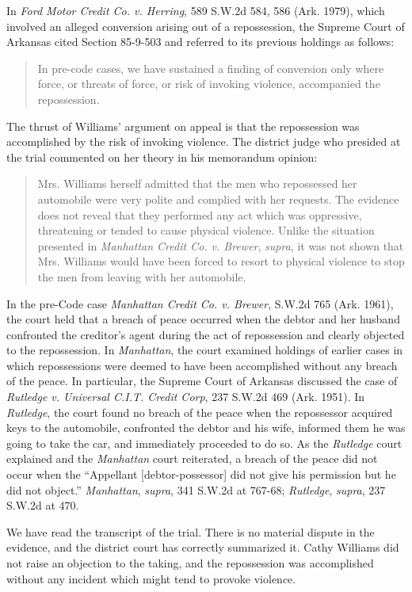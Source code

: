 In \textit{Ford Motor Credit Co. v. Herring}, 589 S.W.2d 584, 586 (Ark. 1979),
which involved an alleged conversion arising out of a repossession, the Supreme
Court of Arkansas cited Section 85-9-503 and referred to its previous holdings
as follows:
\begin{quote}
In pre-code cases, we have sustained a finding of conversion only where force,
or threats of force, or risk of invoking violence, accompanied the
repossession.
\end{quote}
The thrust of Williams' argument on appeal is that the repossession was
accomplished by the risk of invoking violence. The district judge who presided
at the trial commented on her theory in his memorandum opinion:
\begin{quote}
Mrs. Williams herself admitted that the men who repossessed her automobile were
very polite and complied with her requests. The evidence does not reveal that
they performed any act which was oppressive, threatening or tended to cause
physical violence. Unlike the situation presented in \textit{Manhattan Credit
Co. v. Brewer}, \textit{supra}, it was not shown that Mrs. Williams would have
been forced to resort to physical violence to stop the men from leaving with
her automobile.
\end{quote}
In the pre-Code case \textit{Manhattan Credit Co. v. Brewer}, S.W.2d 765 (Ark.
1961), the court held that a breach of peace occurred when the debtor and her
husband confronted the creditor's agent during the act of repossession and
clearly objected to the repossession. In \textit{Manhattan}, the court examined
holdings of earlier cases in which repossessions were deemed to have been
accomplished without any breach of the peace. In particular, the Supreme Court
of Arkansas discussed the case of \textit{Rutledge v. Universal C.I.T. Credit
Corp}, 237 S.W.2d 469 (Ark. 1951). In \textit{Rutledge}, the court found no
breach of the peace when the repossessor acquired keys to the automobile,
confronted the debtor and his wife, informed them he was going to take the car,
and immediately proceeded to do so. As the \textit{Rutledge} court explained
and the \textit{Manhattan} court reiterated, a breach of the peace did not
occur when the ``Appellant [debtor-possessor] did not give his permission but
he did not object.'' \textit{Manhattan}, \textit{supra}, 341 S.W.2d at 767-68;
\textit{Rutledge}, \textit{supra}, 237 S.W.2d at 470.

We have read the transcript of the trial. There is no material dispute in the
evidence, and the district court has correctly summarized it. Cathy Williams
did not raise an objection to the taking, and the repossession was accomplished
without any incident which might tend to provoke violence.

